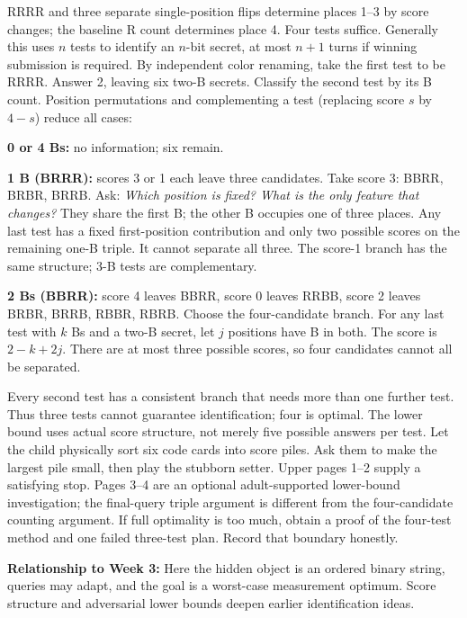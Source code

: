 \documentclass[11pt]{article}
\begin{document}
\newpage
{}
RRRR and three separate single-position flips determine places 1--3 by score changes; the baseline R count determines place 4. Four tests suffice. Generally this uses \(n\) tests to identify an \(n\)-bit secret, at most \(n+1\) turns if winning submission is required.
By independent color renaming, take the first test to be RRRR. Answer 2, leaving six two-B secrets. Classify the second test by its B count. Position permutations and complementing a test (replacing score \(s\) by \(4-s\)) reduce all cases:

\textbf{0 or 4 Bs:} no information; six remain.

\textbf{1 B (BRRR):} scores 3 or 1 each leave three candidates. Take score 3: BBRR, BRBR, BRRB. Ask: \emph{Which position is fixed? What is the only feature that changes?} They share the first B; the other B occupies one of three places. Any last test has a fixed first-position contribution and only two possible scores on the remaining one-B triple. It cannot separate all three. The score-1 branch has the same structure; 3-B tests are complementary.

\textbf{2 Bs (BBRR):} score 4 leaves BBRR, score 0 leaves RRBB, score 2 leaves BRBR, BRRB, RBBR, RBRB. Choose the four-candidate branch. For any last test with \(k\) Bs and a two-B secret, let \(j\) positions have B in both. The score is \(2-k+2j\). There are at most three possible scores, so four candidates cannot all be separated.

Every second test has a consistent branch that needs more than one further test. Thus three tests cannot guarantee identification; four is optimal. The lower bound uses actual score structure, not merely five possible answers per test.
Let the child physically sort six code cards into score piles. Ask them to make the largest pile small, then play the stubborn setter. Upper pages 1--2 supply a satisfying stop. Pages 3--4 are an optional adult-supported lower-bound investigation; the final-query triple argument is different from the four-candidate counting argument. If full optimality is too much, obtain a proof of the four-test method and one failed three-test plan. Record that boundary honestly.

\textbf{Relationship to Week 3:} Here the hidden object is an ordered binary string, queries may adapt, and the goal is a worst-case measurement optimum. Score structure and adversarial lower bounds deepen earlier identification ideas.
\end{document}
